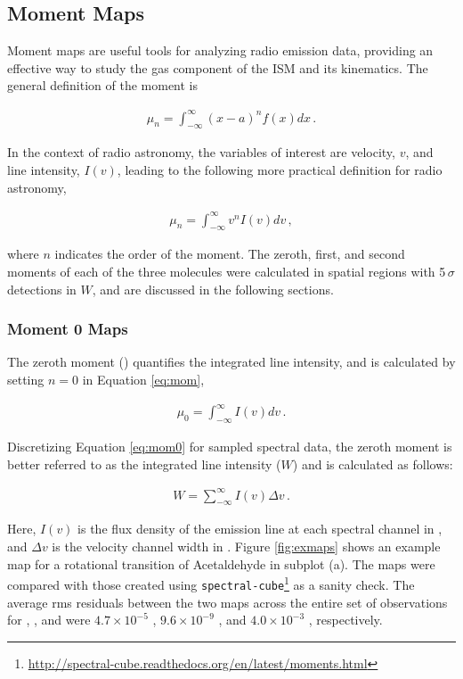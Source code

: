 \documentclass[iop,twocolappendix]{emulateapj}
\begin{document}
\subsection{Moment Maps}
\label{subsec:maps}

Moment maps are useful tools for analyzing radio emission data, providing an effective way to study the gas component of the ISM and its kinematics. The general definition of the moment is

\begin{align} \label{eq:mom_int}
{\mu}_n = \int_{-\infty}^{\infty} (x - a)^n f(x)dx\,.
\end{align}

{\noindent}In the context of radio astronomy, the variables of interest are velocity, $v$, and line intensity, $I(v)$, leading to the following more practical definition for radio astronomy,

\begin{align} \label{eq:mom}
{\mu}_n = \int_{-\infty}^{\infty} v^n I(v)dv\,,
\end{align}

{\noindent}where $n$ indicates the order of the moment. The zeroth, first, and second moments of each of the three molecules were calculated in spatial regions with 5\,$\sigma$ detections in $W$, and are discussed in the following sections.

\subsubsection{Moment 0 Maps}
\label{subsubsec:mom0}

The zeroth moment (\momzero) quantifies the integrated line intensity, and is calculated by setting $n=0$ in Equation \ref{eq:mom},

\begin{align} \label{eq:mom0}
{\mu}_0 = \int_{-\infty}^{\infty} I(v)dv\,.
\end{align}

{\noindent}Discretizing Equation \ref{eq:mom0} for sampled spectral data, the zeroth moment is better referred to as the integrated line intensity ($W$) and is calculated as follows:

\begin{align} \label{eq:W}
W = \sum_{-\infty}^{\infty} I(v){\Delta}v\,.
\end{align}

{\noindent}Here, $I(v)$ is the flux density of the emission line at each spectral channel in {\Jybeam}, and ${\Delta}v$ is the velocity channel width in \kms. Figure \ref{fig:exmaps} shows an example {\momzero} map for a rotational transition of Acetaldehyde in subplot (a). The {\momzero} maps were compared with those created using {\tt spectral-cube}\footnote{\url{http://spectral-cube.readthedocs.org/en/latest/moments.html}} as a sanity check. The average rms residuals between the two {\momzero} maps across the entire set of observations for {\A}, {\M}, and {\MF} were $4.7 {\times}10^{-5}$ {\Jybeamkms}, $9.6 {\times}10^{-9}$ {\Jybeamkms}, and $4.0 {\times}10^{-3}$ {\Jybeamkms}, respectively. 
\end{document}
